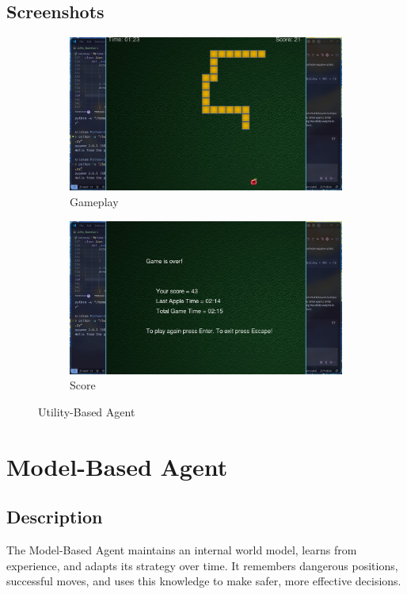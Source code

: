 \documentclass[11pt,a4paper]{article}
\begin{document}
\subsection{Screenshots}
\begin{figure}[H]
    \centering
    \begin{subfigure}{0.45\textwidth}
        \includegraphics[width=\textwidth]{ss/utility_based_play.png}
        \caption{Gameplay}
    \end{subfigure}
    \hfill
    \begin{subfigure}{0.45\textwidth}
        \includegraphics[width=\textwidth]{ss/utility_based_score.png}
        \caption{Score}
    \end{subfigure}
    \caption{Utility-Based Agent}
\end{figure}

\section{Model-Based Agent}
\subsection{Description}
The Model-Based Agent maintains an internal world model, learns from experience, and adapts its strategy over time. It remembers dangerous positions, successful moves, and uses this knowledge to make safer, more effective decisions.
\end{document}
